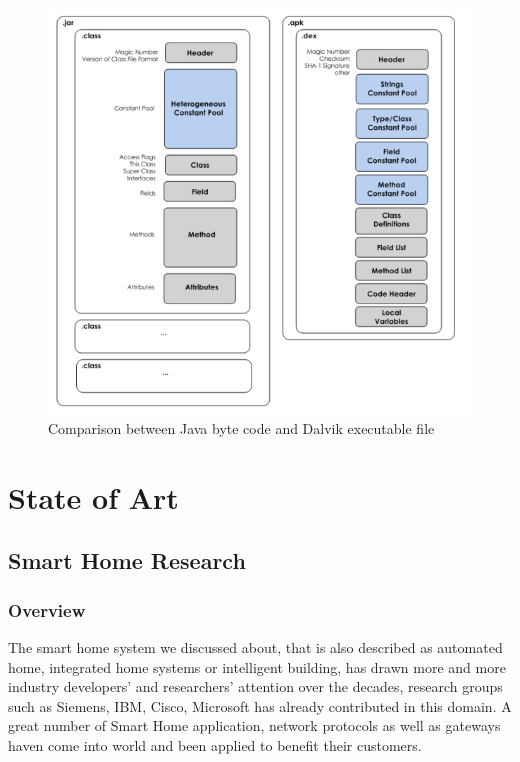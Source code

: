 \documentclass[]{llncs}
\begin{document}
 \begin{figure}[!htbp]
	\centering
	\includegraphics[width=1.0\textwidth]{clas-vs-dex.jpg}
		\caption[]{Comparison between Java byte code and Dalvik executable file\cite{android_vm}}
	\label{fig:class-vs-dex}
\end{figure}

\section{State of Art}
\subsection{Smart Home Research}
\subsubsection{Overview}
The smart home system we discussed about, that is also described as automated home, integrated home systems or intelligent building\cite{smart_home_concept}, has drawn more and more industry developers' and researchers' attention over the decades, research groups such as Siemens, IBM, Cisco, Microsoft\cite{smart_home_research} has already contributed in this domain. A great number of Smart Home application, network protocols as well as gateways\cite{smart_home_for_gateway} haven come into world and been applied to benefit their customers.
\end{document}

